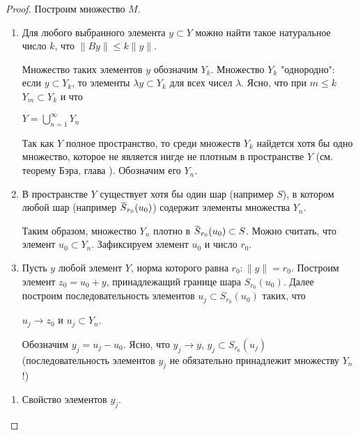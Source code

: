 \documentclass[12pt,a4paper,titlepage,oneside]{book}
\newcommand{\overbar}[1]{\mkern 1.5mu\overline{\mkern-1.5mu#1\mkern-1.5mu}\mkern 1.5mu}
\theoremstyle{definition}
\theoremstyle{plain}
\theoremstyle{remark}
\theoremstyle{remark}
\theoremstyle{remark}
\theoremstyle{remark}
\theoremstyle{plain}
\theoremstyle{plain}
\begin{document}
\begin{proof}
	
Построим множество $M$.

\begin{enumerate}
	\item Для любого выбранного элемента $y \subset Y$ можно найти такое натуральное число $k$, что $\lVert By\rVert \leq k\lVert y\rVert$.
	
	Множество таких элементов $y$ обозначим $Y_k$. Множество $Y_k$ "однородно": если $y \subset Y_k$, то элементы $\lambda y \subset Y_k$ для всех чисел $\lambda$. Ясно, что при $m \leq k$ $Y_m \subset Y_k$ и что

\begin{center}	

	$Y=\bigcup\limits_{n=1}^\infty Y_n$
	
\end{center}
	
	Так как $Y$ полное пространство, то среди множеств $Y_k$ найдется хотя бы одно множество, которое не является нигде не плотным в пространстве $Y$ (см. теорему Бэра, глава \uppercase\expandafter{}). Обозначим его $Y_n$.
	
	\item В пространстве $Y$ существует хотя бы один шар (например $S$), в котором любой шар (например $\overbar{S}_{r_0}(u_0)$) содержит элементы множества $Y_n$.
	
	Таким образом, множество $Y_n$ плотно в $\overbar{S}_{r_0}(u_0)\subset S$. Можно считать, что элемент $u_0 \subset Y_n$. Зафиксируем элемент $u_0$ и число $r_0$.
	
	\item Пусть $y$ любой элемент $Y$, норма которого равна $r_0:\lVert y\rVert=r_0$. Построим элемент $z_0=u_0+y$, принадлежащий границе шара $S_{r_0}(u_0)$. Далее построим последовательность элементов $u_j \subset S_{r_0}(u_0)$ таких, что

\begin{center}	

	$u_j \to z_0$ и $u_j \subset Y_n$.
	
\end{center}

Обозначим $y_j=u_j-u_0$. Ясно, что $y_j \to y$, $y_j \subset S_{r_0}(u_j)$ (последовательность элементов $y_j$ не обязательно принадлежит множеству $Y_n$!)
	
\end{enumerate}


\begin{enumerate}
\item Свойство элементов $y_j$.


\end{enumerate}
\end{proof}
\end{document}
